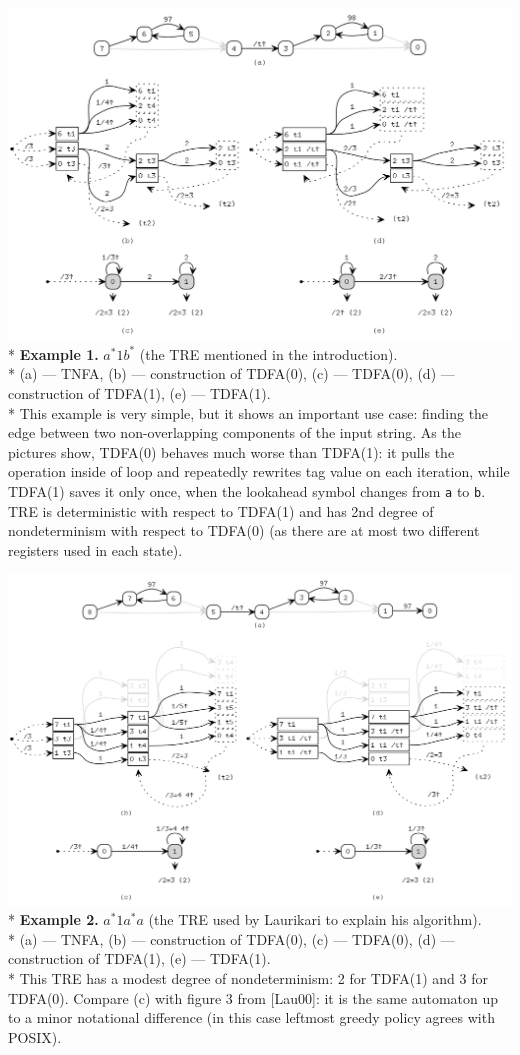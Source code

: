 \documentclass{article}
\newenvironment{Xfig}
    {\par\medskip\noindent\minipage{\linewidth}\begin{center}}
    {\end{center}\endminipage\par\medskip}
\theoremstyle{definition}
\begin{document}
\begin{Xfig}
\includegraphics[width=0.9\linewidth]{img/example1/all.png}\\*
\textbf{Example 1.} $a^* 1 b^*$ (the TRE mentioned in the introduction).\\*
(a) --- TNFA, (b) --- construction of TDFA(0), (c) --- TDFA(0), (d) --- construction of TDFA(1), (e) --- TDFA(1).
\\*\medskip
This example is very simple, but it shows an important use case:
finding the edge between two non-overlapping components of the input string.
As the pictures show, TDFA(0) behaves much worse than TDFA(1):
it pulls the operation inside of loop and repeatedly rewrites tag value on each iteration,
while TDFA(1) saves it only once, when the lookahead symbol changes from \texttt{a} to \texttt{b}.
TRE is deterministic with respect to TDFA(1)
and has 2nd degree of nondeterminism with respect to TDFA(0)
(as there are at most two different registers used in each state).
\end{Xfig}

\begin{Xfig}
\includegraphics[width=0.9\linewidth]{img/example2/all.png}\\*
\textbf{Example 2.} $a^* 1 a^* a$ (the TRE used by Laurikari to explain his algorithm).\\*
(a) --- TNFA, (b) --- construction of TDFA(0), (c) --- TDFA(0), (d) --- construction of TDFA(1), (e) --- TDFA(1).\\*
This TRE has a modest degree of nondeterminism: 2 for TDFA(1) and 3 for TDFA(0).
Compare (c) with figure 3 from [Lau00]: it is the same automaton up to a minor notational difference
(in this case leftmost greedy policy agrees with POSIX).
\end{Xfig}
\end{document}

